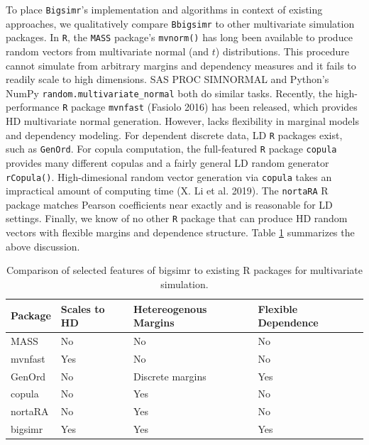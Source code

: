 \documentclass{article}
\begin{document}
To place \texttt{Bigsimr}'s implementation and algorithms in context of
existing approaches, we qualitatively compare \texttt{Bbigsimr} to other
multivariate simulation packages. In \texttt{R}, the \texttt{MASS}
package's \texttt{mvnorm()} has long been available to produce random
vectors from multivariate normal (and \(t\)) distributions. This
procedure cannot simulate from arbitrary margins and dependency measures
and it fails to readily scale to high dimensions. SAS PROC SIMNORMAL and
Python's NumPy \texttt{random.multivariate\_normal} both do similar
tasks. Recently, the high-performance \texttt{R} package
\texttt{mvnfast} (Fasiolo 2016) has been released, which provides HD
multivariate normal generation. However, lacks flexibility in marginal
models and dependency modeling. For dependent discrete data, LD
\texttt{R} packages exist, such as \texttt{GenOrd}. For copula
computation, the full-featured \texttt{R} package \texttt{copula}
provides many different copulas and a fairly general LD random generator
\texttt{rCopula()}. High-dimesional random vector generation via
\texttt{copula} takes an impractical amount of computing time (X. Li et
al. 2019). The \texttt{nortaRA} R package matches Pearson coefficients
near exactly and is reasonable for LD settings. Finally, we know of no
other \texttt{R} package that can produce HD random vectors with
flexible margins and dependence structure. Table \ref{tab:compare-table}
summarizes the above discussion.

\begin{table}[h]
\centering
\caption{\label{tab:compare-table}Comparison of selected features of bigsimr to existing R packages for multivariate simulation.}
\begin{tabular}{@{}llll@{}}
Package & Scales to HD & Hetereogenous Margins & Flexible Dependence \\ \midrule
MASS      & No           & No                    & No                  \\
mvnfast   & Yes          & No                    & No                  \\
GenOrd    & No           & Discrete margins      & Yes                 \\
copula    & No           & Yes                   & No                  \\
nortaRA   & No           & Yes                   & No                  \\
bigsimr   & Yes          & Yes                   & Yes                
\end{tabular}
\end{table}
\end{document}
